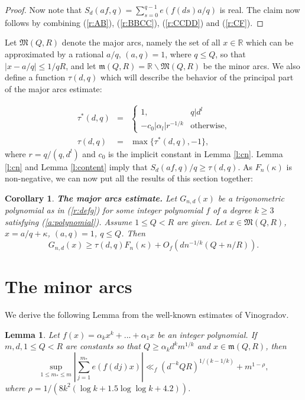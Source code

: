 \documentclass{amsart}
\newtheorem {corollary}{Corollary}
\newtheorem {lemma}{Lemma}
\numberwithin {equation}{section}
\begin{document}
\begin{proof}
Now note that $S_{d}(af,q)=\sum _{s=0}^{q-1}e(f(ds)a/q)$ is real. The claim
now follows by combining (\ref{r:AB}), (\ref{r:BBCC}), (\ref{r:CCDD}) and (\ref{r:CF}).
\end{proof}

Let ${\mathfrak{M}}(Q,R)$ denote the major arcs, namely the set of all $x\in 
{\mathbb{R}}$ which can be approximated by a rational $a/q$, $(a,q)=1$,
where $q\leq Q$, so that $|x-a/q|\leq 1/qR$, and let ${\mathfrak{m}}(Q,R)={\mathbb{R}}\backslash {\mathfrak{M}}(Q,R)$ be the minor arcs. We also define
a function $\tau (d,q)$ which will describe the behavior of the principal
part of the major arcs estimate:

\begin{eqnarray*}
\tau ^{\ast }(d,q)&=&\left \{ 
\begin{array}{cc}
1, & q|d^{l} \\ 
-c_{0}|\alpha _l|r^{-1/k} & {\text {otherwise,}}\end{array}
\right . \\
\tau (d,q)&=&\max \{\tau ^{\ast }(d,q),-1\},
\end{eqnarray*}
where $r=q/(q,d^{l})$ and $c_{0}$ is the implicit constant in Lemma \ref{l:cn}. Lemma \ref{l:cn} and Lemma \ref{l:content} imply that $S_{d}(af,q)/q\geq \tau (d,q)$. As $F_{n}(\kappa )$ is non-negative, we can
now put all the results of this section together:

\begin{corollary}
\label{c:major}\textbf{The major arcs estimate.} Let $G_{n,d}(x)$ be a
trigonometric polynomial as in (\ref{r:defg}) for some integer polynomial $f$
of a degree $k\geq 3$ satisfying (\ref{a:polynomial}). Assume $1\leq Q<R$
are given. Let $x\in {\mathfrak{M}}(Q,R)$, $x=a/q+\kappa $, $(a,q)=1$, $q\leq Q$. Then 
\begin{equation*}
G_{n,d}(x)\geq \tau (d,q)F_{n}(\kappa )+O_{f}(dn^{-1/k}(Q+n/R)){\text{.}}
\end{equation*}
\end{corollary}

\section{The minor arcs}

We derive the following Lemma from the well-known estimates of Vinogradov.

\begin{lemma}
\label{l:vinogradov}Let $f(x)=\alpha _{k}x^{k}+...+\alpha _{1}x$ be an
integer polynomial. If $m,d,1\leq Q<R$ are constants so that $Q\geq \alpha
_{k}d^{k}m^{1/k}$ and $x\in {\mathfrak{m}}(Q,R)$, then 
\begin{equation*}
\sup _{1\leq m_{\ast }\leq m}\left \vert \sum _{j=1}^{m_{\ast
}}e(f(dj)x)\right \vert \ll _{f}\left (d^{-k}QR\right
)^{1/(k-1/k)}+m^{1-\rho },
\end{equation*}
where $\rho =1/(8k^{2}(\log k+1.5\log \log k+4.2))$.
\end{lemma}
\end{document}
